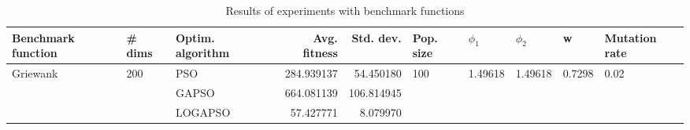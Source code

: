 \begin{table}
\centering
\caption{Results of experiments with benchmark functions}
\begin{tabular}{lllrrlllll}
\toprule
       Benchmark function &              \# dims & Optim. algorithm &  Avg. fitness &  Std. dev. &            Pop. size &               $\phi_{1}$ &               $\phi_{2}$ &                       w &         Mutation rate \\
\midrule
\multirow{3}{*}{Griewank} & \multirow{3}{*}{200} &              PSO &    284.939137 &  54.450180 & \multirow{3}{*}{100} & \multirow{3}{*}{1.49618} & \multirow{3}{*}{1.49618} & \multirow{3}{*}{0.7298} & \multirow{3}{*}{0.02} \\
                          &                      &            GAPSO &    664.081139 & 106.814945 &                      &                          &                          &                         &                       \\
                          &                      &          LOGAPSO &     57.427771 &   8.079970 &                      &                          &                          &                         &                       \\
\bottomrule
\end{tabular}
\end{table}
